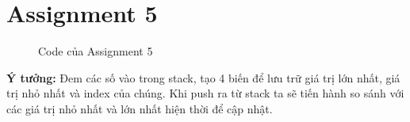\documentclass[a4paper,12pt]{article}
\begin{document}
\section{Assignment 5}
\begin{figure}[!h]
	\centerline{}
\end{figure}
\begin{figure}[!h]
	\centerline{}
	\caption{Code của Assignment 5}
\end{figure}
\textbf{Ý tưởng: }Đem các số vào trong stack, tạo 4 biến để lưu trữ giá trị lớn nhất, giá trị nhỏ nhất và index của chúng. Khi push ra từ stack ta sẽ tiến hành so sánh với các giá trị nhỏ nhất và lớn nhất hiện thời để cập nhật.
\end{document}
